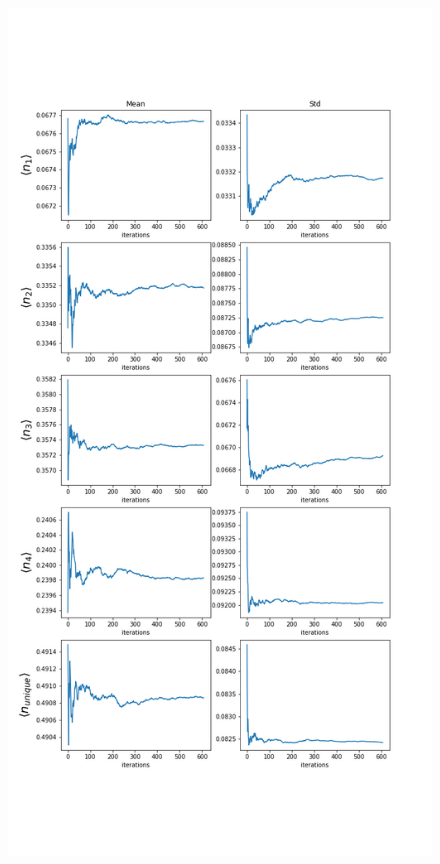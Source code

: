 \begin{figure}
\begin{minipage}{0.32\textwidth}
\end{minipage}
\begin{minipage}{0.67\textwidth}
     \includegraphics[width=\textwidth]{Sections/Images_2/DS_100_history.png}
\end{minipage}
	
\end{figure}

